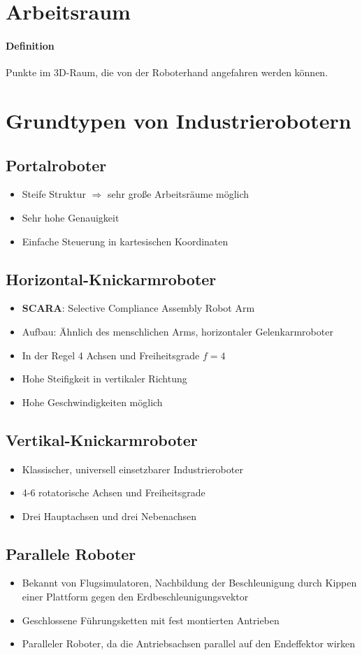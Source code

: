 \section{Arbeitsraum}
\paragraph{Definition} Punkte im 3D-Raum, die von der Roboterhand angefahren werden können.
\section{Grundtypen von Industrierobotern}
\subsection{Portalroboter}
\begin{itemize}
	\item Steife Struktur $\Rightarrow$ sehr große Arbeitsräume möglich
	\item Sehr hohe Genauigkeit
	\item Einfache Steuerung in kartesischen Koordinaten
\end{itemize}
\subsection{Horizontal-Knickarmroboter}
\begin{itemize}
	\item \textbf{SCARA}: Selective Compliance Assembly Robot Arm
	\item Aufbau: Ähnlich des menschlichen Arms, horizontaler Gelenkarmroboter
	\item In der Regel 4 Achsen und Freiheitsgrade $f = 4$
	\item Hohe Steifigkeit in vertikaler Richtung
	\item Hohe Geschwindigkeiten möglich
\end{itemize}
\subsection{Vertikal-Knickarmroboter}
\begin{itemize}
	\item Klassischer, universell einsetzbarer Industrieroboter
	\item 4-6 rotatorische Achsen und Freiheitsgrade
	\item Drei Hauptachsen und drei Nebenachsen
\end{itemize}
\subsection{Parallele Roboter}
\begin{itemize}
	\item Bekannt von Flugsimulatoren, Nachbildung der Beschleunigung durch Kippen einer Plattform gegen den Erdbeschleunigungsvektor
	\item Geschlossene Führungsketten mit fest montierten Antrieben
	\item Paralleler Roboter, da die Antriebsachsen parallel auf den Endeffektor wirken
\end{itemize}
